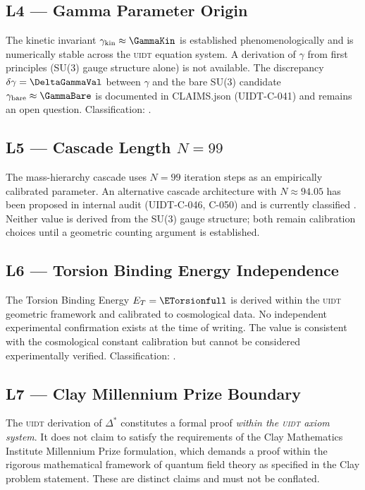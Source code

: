 \subsection{L4 --- Gamma Parameter Origin}
\label{lim:L4}
\begin{limitation}
The kinetic invariant $\gamma_{\mathrm{kin}} \approx \GammaKin$ is
established phenomenologically and is numerically stable across the
\textsc{uidt} equation system. A derivation of $\gamma$ from first
principles (SU(3) gauge structure alone) is not available. The discrepancy
$\delta\gamma = \DeltaGammaVal$ between $\gamma$ and the bare SU(3)
candidate $\gamma_{\mathrm{bare}} \approx \GammaBare$ is documented in
CLAIMS.json (UIDT-C-041) and remains an open question. Classification: \evAminus{}.
\end{limitation}

\subsection{L5 --- Cascade Length $N = 99$}
\label{lim:L5}
\begin{limitation}
The mass-hierarchy cascade uses $N = 99$ iteration steps as an
empirically calibrated parameter. An alternative cascade architecture
with $N \approx 94.05$ has been proposed in internal audit
(UIDT-C-046, C-050) and is currently classified \evE{}. Neither value
is derived from the SU(3) gauge structure; both remain calibration choices
until a geometric counting argument is established.
\end{limitation}

\subsection{L6 --- Torsion Binding Energy Independence}
\label{lim:L6}
\begin{limitation}
The Torsion Binding Energy $E_T = \ETorsionfull$ is derived within the
\textsc{uidt} geometric framework and calibrated to cosmological data.
No independent experimental confirmation exists at the time of writing.
The value is consistent with the cosmological constant calibration but
cannot be considered experimentally verified. Classification: \evC{}.
\end{limitation}

\subsection{L7 --- Clay Millennium Prize Boundary}
\label{lim:clay}
\begin{limitation}
The \textsc{uidt} derivation of $\Delta^*$ constitutes a formal proof
\emph{within the \textsc{uidt} axiom system}. It does not claim to satisfy
the requirements of the Clay Mathematics Institute Millennium Prize
formulation, which demands a proof within the rigorous mathematical
framework of quantum field theory as specified in the Clay problem
statement. These are distinct claims and must not be conflated.
\end{limitation}

